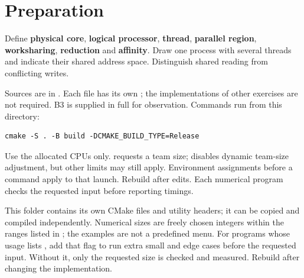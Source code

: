 \section{Preparation}
Define \textbf{physical core}, \textbf{logical processor}, \textbf{thread},
\textbf{parallel region}, \textbf{worksharing}, \textbf{reduction} and
\textbf{affinity}. Draw one process with several threads and indicate their
shared address space. Distinguish shared reading from conflicting writes.

Sources are in . Each file has its own
; the implementations of other exercises are not required. B3 is
supplied in full for observation. Commands run from this  directory:
\begin{lstlisting}[style=shell]
cmake -S . -B build -DCMAKE_BUILD_TYPE=Release
\end{lstlisting}
Use the allocated CPUs only.  requests a team size;
 disables dynamic team-size adjustment, but other limits
may still apply. Environment assignments before a command apply to that launch.
Rebuild after edits. Each numerical program checks the requested input before reporting timings.

This folder contains its own CMake files and utility headers; it can be copied
and compiled independently. Numerical sizes are freely chosen integers within
the ranges listed in ; the examples are not a predefined menu.
For programs whose usage lists , add that flag to run extra
small and edge cases before the requested input. Without it, only the requested
size is checked and measured. Rebuild after changing the implementation.

